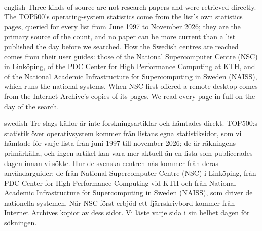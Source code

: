 \paragraph{} %
\begin{onlyin}{english} %
Three kinds of source are not research papers and were retrieved
directly.  The TOP500's operating-system statistics come from the list's
own statistics pages, queried for every list from June 1997 to November
2026; they are the primary source of the count, and no paper can be more
current than a list published the day before we searched.  How the
Swedish centres are reached comes from their user guides: those of the
National Supercomputer Centre (NSC) in Linköping, of the PDC Center for
High Performance Computing at KTH, and of the National Academic
Infrastructure for Supercomputing in Sweden (NAISS), which runs the
national systems.  When NSC first offered a remote desktop comes from the
Internet Archive's copies of its pages.  We read every page in full on
the day of the search.
\end{onlyin}
\begin{onlyin}{swedish}
Tre slags källor är inte forskningsartiklar och hämtades direkt.
TOP500:s statistik över operativsystem kommer från listans egna
statistiksidor, som vi hämtade för varje lista från juni 1997 till november
2026; de är räkningens primärkälla, och ingen artikel kan vara mer
aktuell än en lista som publicerades dagen innan vi sökte.  Hur de
svenska centren nås kommer från deras användarguider: de från National
Supercomputer Centre (NSC) i Linköping, från PDC Center for High
Performance Computing vid KTH och från National Academic Infrastructure
for Supercomputing in Sweden (NAISS), som driver de nationella systemen.
När NSC först erbjöd ett fjärrskrivbord kommer från Internet Archives
kopior av dess sidor.  Vi läste varje sida i sin helhet dagen för
sökningen.
\end{onlyin}

\section{} %
\label{sec:hpc-cli-results}

